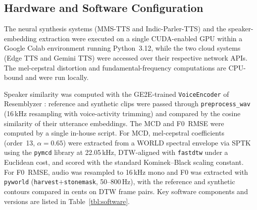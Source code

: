 \documentclass[a4paper,fleqn]{cas-dc}
\begin{document}
    
    \subsection{Hardware and Software Configuration}\label{sec:expsetup-hw}
    
    The neural synthesis systems (MMS-TTS and Indic-Parler-TTS) and the
    speaker-embedding extraction were executed on a single CUDA-enabled GPU within a
    Google Colab environment running Python~3.12, while the two cloud systems (Edge
    TTS and Gemini TTS) were accessed over their respective network APIs. The
    mel-cepstral distortion and fundamental-frequency computations are
    CPU-bound and were run locally.
    
    Speaker similarity was computed with the GE2E-trained \texttt{VoiceEncoder} of
    Resemblyzer \citep{wan2018ge2e}: reference and synthetic clips were passed
    through \texttt{preprocess\_wav} (16\,kHz resampling with voice-activity
    trimming) and compared by the cosine similarity of their utterance embeddings.
    The MCD and F0~RMSE were computed by a single in-house script. For MCD,
    mel-cepstral coefficients (order~13, $\alpha = 0.65$) were extracted from
    a WORLD spectral envelope via SPTK using the \texttt{pymcd} library at
    22.05\,kHz, DTW-aligned with \texttt{fastdtw} under a Euclidean cost, and
    scored with the standard Kominek--Black scaling constant. For F0~RMSE,
    audio was resampled to 16\,kHz mono and F0 was extracted with
    \texttt{pyworld} (\texttt{harvest}$+$\texttt{stonemask}, 50--800\,Hz),
    with the reference and synthetic contours compared in cents on DTW frame
    pairs. Key software components and versions are listed in
    Table~\ref{tbl:software}.
    
\end{document}
